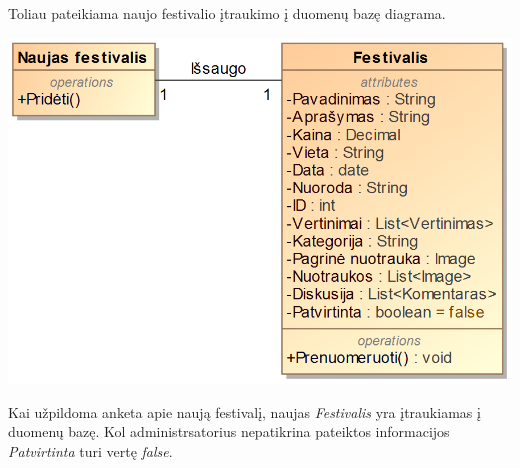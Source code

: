 ﻿\documentclass{VUMIFPSkursinis}
\begin{document}
Toliau pateikiama naujo festivalio įtraukimo į duomenų bazę diagrama.
\begin{center}
    \includegraphics[scale=0.5]{img/PSI3/naujas.PNG}
\end{center}
Kai užpildoma anketa apie naują festivalį, naujas \textit{Festivalis} yra įtraukiamas į duomenų bazę. Kol administrsatorius nepatikrina pateiktos informacijos \textit{Patvirtinta} turi vertę \textit{false}.
\end{document}
